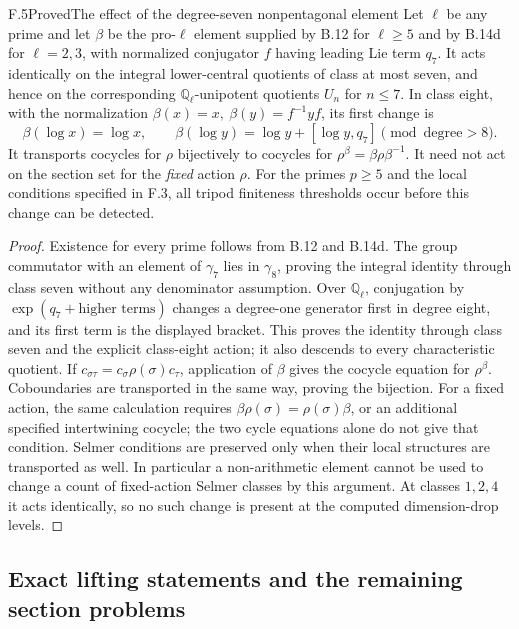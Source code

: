 \begin{statement}{F.5}{Proved}{The effect of the degree-seven nonpentagonal element}
Let $\ell$ be any prime and let $\beta$ be the pro-$\ell$
element supplied by B.12 for $\ell\ge5$ and by B.14d
for $\ell=2,3$, with normalized conjugator $f$ having
leading Lie term $q_7$. It acts identically on the
integral lower-central quotients of class at most seven,
and hence on the corresponding $\mathbb Q_\ell$-unipotent
quotients $U_n$ for $n\le7$.
In class eight, with the normalization
$\beta(x)=x,\ \beta(y)=f^{-1}yf$, its first change is
\[
 \beta(\log x)=\log x,\qquad
 \beta(\log y)=\log y+[\log y,q_7]\pmod{\text{degree}>8}.
\]
It transports cocycles for $\rho$ bijectively to cocycles
for $\rho^\beta=\beta\rho\beta^{-1}$. It need not act
on the section set for the \emph{fixed} action $\rho$.
For the primes $p\ge5$ and the local conditions specified
in F.3, all tripod finiteness thresholds occur before
this change can be detected.
\end{statement}
\begin{proof}
Existence for every prime follows from B.12 and B.14d.
The group commutator with an element of $\gamma_7$
lies in $\gamma_8$, proving the integral identity
through class seven without any denominator assumption.
Over $\mathbb Q_\ell$, conjugation by
$\exp(q_7+\text{higher terms})$ changes
a degree-one generator first in degree eight, and its
first term is the displayed bracket. This proves the
identity through class seven and the explicit class-eight
action; it also descends to every characteristic quotient.
If $c_{\sigma\tau}=c_\sigma\rho(\sigma)c_\tau$, application
of $\beta$ gives the cocycle equation for $\rho^\beta$.
Coboundaries are transported in the same way, proving
the bijection. For a fixed action, the same calculation
requires $\beta\rho(\sigma)=\rho(\sigma)\beta$, or an
additional specified intertwining cocycle; the two
cycle equations alone do not give that condition.
Selmer conditions are preserved only when their local
structures are transported as well. In particular a
non-arithmetic element cannot be used to change a count
of fixed-action Selmer classes by this argument.
At classes $1,2,4$ it acts identically, so no such
change is present at the computed dimension-drop levels.
\end{proof}




\subsection{Exact lifting statements and the remaining section problems}

